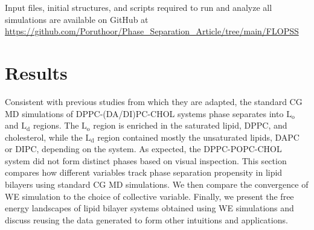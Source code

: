 \documentclass{biophys-new}
\begin{document}
Input files, initial structures, and scripts required to run and analyze all simulations are available on GitHub at \href{https://github.com/Poruthoor/Phase\_Separation\_Article/tree/main/FLOPSS}{https://github.com/Poruthoor/Phase\_Separation\_Article/tree/main/FLOPSS}

\section*{Results}

Consistent with previous studies from which they are adapted, the standard CG MD simulations of DPPC-(DA/DI)PC-CHOL systems phase separates into $\text{L}_{\text{o}}$ and $\text{L}_{\text{d}}$ regions.
The $\text{L}_{\text{o}}$ region is enriched in the saturated lipid, DPPC, and cholesterol, while the  
$\text{L}_{\text{d}}$ region contained mostly the unsaturated lipids, DAPC or DIPC, depending on the system.
As expected, the DPPC-POPC-CHOL system did not form distinct phases based on visual inspection.
This section compares how different variables track phase separation propensity in lipid bilayers using standard CG MD simulations.
We then compare the convergence of WE simulation to the choice of collective variable.
Finally, we present the free energy landscapes of lipid bilayer systems obtained using WE simulations and discuss reusing the data generated to form other intuitions and applications.

\end{document}
